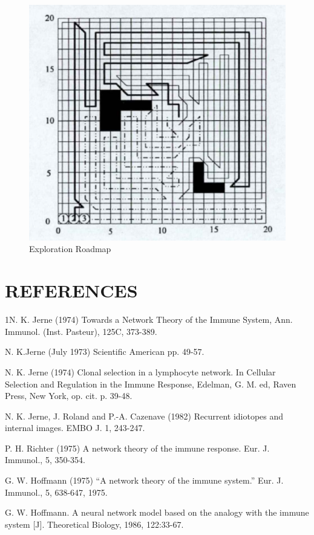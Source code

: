 \documentclass[Proceedings]{ascelike}
\begin{document}
\begin{figure}
\centering
    \includegraphics[scale=0.50] {img/immune_network_route_map.png}
    \caption{Exploration Roadmap}
\end{figure}

\section{REFERENCES}
\noindent
[1] 1N. K. Jerne (1974) Towards a Network Theory of the Immune System, Ann. Immunol. (Inst. Pasteur), 125C, 373-389.
\par
\noindent 
[2] N. K.Jerne (July 1973) Scientific American pp. 49-57. 
\par
\noindent
[3] N. K. Jerne (1974) Clonal selection in a lymphocyte network. In Cellular Selection and Regulation in the Immune Response, Edelman, G. M. ed, Raven Press, New York, op. cit. p. 39-48.
\par
\noindent
[4] N. K. Jerne, J. Roland and P.-A. Cazenave (1982) Recurrent idiotopes and internal images. EMBO J. 1, 243-247.
\par
\noindent
[5] P. H. Richter (1975) A network theory of the immune response. Eur. J. Immunol., 5, 350-354.
\par
\noindent
[6] G. W. Hoffmann (1975) “A network theory of the immune system.” Eur. J. Immunol., 5, 638-647, 1975.
\par
\noindent
[7] G. W. Hoffmann. A neural network model based on the analogy with the immune system [J]. Theoretical Biology, 1986, 122:33-67.
\end{document}
